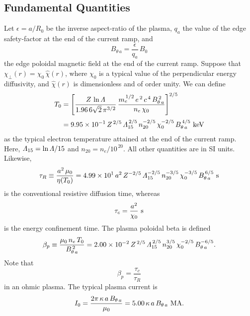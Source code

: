 \documentclass[12pt,prb,aps]{revtex4-1}
\begin{document}
 \subsection{Fundamental Quantities}
 Let $\epsilon= a/R_0$ be the inverse aspect-ratio of the plasma, $q_a$ the value of the edge safety-factor at the end of the current ramp, and 
 \begin{equation}
 B_{\theta\,a}= \frac{\epsilon}{q_a}\,B_0
 \end{equation}
 the edge poloidal magnetic field at the end of the current ramp. Suppose that $\chi_\perp (r)= \chi_0\,\hat{\chi}(r)$, where $\chi_0$ is a
 typical value of the perpendicular energy diffusivity, and $\hat{\chi}(r)$ is dimensionless and of order unity. 
 We can define
 \begin{align}
 T_0&= \left[\frac{Z\,\ln{\mit\Lambda}}{1.96\,6\sqrt{2}\,\pi^{3/2}}\,\frac{m_e^{\,1/2}\,e^{\,2}\,c^{\,4}\,B_{\theta\,a}^{\,2}}{n_e\,\chi_0}\right]^{2/5}\\[0.5ex]
 &= 9.95\times 10^{-1}\,Z^{\,2/5}\,{\mit\Lambda}_{15}^{\,2/5}\,n_{20}^{-2/5}\,\chi_0^{-2/5}\,B_{\theta\,a}^{\,4/5}\,\,{\rm keV}
 \end{align}
 as the typical electron temperature attained at the end of the current ramp. Here, ${\mit\Lambda}_{15}=\ln{\mit\Lambda}/15$ and $n_{20}=n_e/10^{\,20}$. 
 All other quantities are in SI units. Likewise, 
 \begin{equation}
 \tau_R \equiv \frac{a^2\,\mu_0}{\eta(T_0)}= 4.99\times 10^1\,a^2\,Z^{-2/5}\,{\mit\Lambda}_{15}^{-2/5}\,n_{20}^{-3/5}\,\chi_0^{-3/5}\,B_{\theta\,a}^{\,6/5}\,\,{\rm s}
 \end{equation}
 is the conventional resistive diffusion time, whereas 
 \begin{equation}
 \tau_c= \frac{a^2}{\chi_0}\,\,{\rm s}
 \end{equation}
 is the energy confinement time. The plasma poloidal beta is defined
 \begin{equation}\label{e16}
 \beta_p\equiv \frac{\mu_0\,n_e\,T_0}{B_{\theta\,a}^{\,2}} =  2.00\times 10^{-2}\,Z^{\,2/5}\,{\mit\Lambda}_{15}^{\,2/5}\,n_{20}^{3/5}\,\chi_0^{-2/5}\,B_{\theta\,a}^{-6/5}.
 \end{equation}
 Note that
 \begin{equation}\label{e17}
 \beta_p = \frac{\tau_c}{\tau_R}
 \end{equation}
 in an ohmic plasma. 
 The typical plasma current is
 \begin{equation}
 I_0= \frac{2\pi\,\kappa\,a\,B_{\theta\,a}}{\mu_0} = 5.00\,\kappa\,a\,B_{\theta\,a}\,\,{\rm MA}.
 \end{equation}
\end{document}

